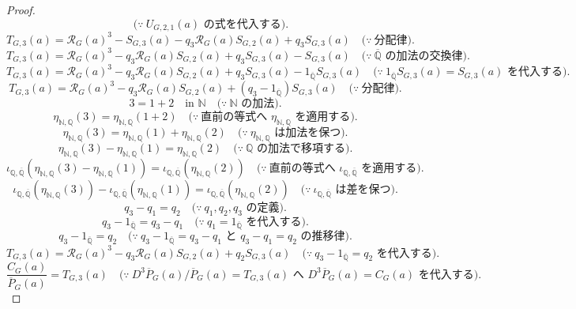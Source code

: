 \documentclass[11pt,a4paper]{article}
\theoremstyle{remark}
\begin{document}
\begin{proof}
\[\quad\bigl(\because\ U_{G,2,1}(a)\text{ の式を代入する}\bigr).\]
\[T_{G,3}(a)
=
\mathcal R_G(a)^3
-S_{G,3}(a)
-q_3\mathcal R_G(a)S_{G,2}(a)
+q_3S_{G,3}(a)
\quad\bigl(\because\ \text{分配律}\bigr).\]
\[T_{G,3}(a)
=
\mathcal R_G(a)^3
-q_3\mathcal R_G(a)S_{G,2}(a)
+q_3S_{G,3}(a)
-S_{G,3}(a)
\quad\bigl(\because\ \overline{\mathbb Q}\text{ の加法の交換律}\bigr).\]
\[T_{G,3}(a)
=
\mathcal R_G(a)^3
-q_3\mathcal R_G(a)S_{G,2}(a)
+q_3S_{G,3}(a)
-1_{\overline{\mathbb Q}}S_{G,3}(a)
\quad\bigl(\because\ 1_{\overline{\mathbb Q}}S_{G,3}(a)=S_{G,3}(a)\text{ を代入する}\bigr).\]
\[T_{G,3}(a)
=
\mathcal R_G(a)^3
-q_3\mathcal R_G(a)S_{G,2}(a)
+(q_3-1_{\overline{\mathbb Q}})S_{G,3}(a)
\quad\bigl(\because\ \text{分配律}\bigr).\]
\[3=1+2
\quad\text{in }\mathbb N
\quad\bigl(\because\ \mathbb N\text{ の加法}\bigr).\]
\[\eta_{\mathbb N,\mathbb Q}(3)
=\eta_{\mathbb N,\mathbb Q}(1+2)
\quad\bigl(\because\ \text{直前の等式へ }\eta_{\mathbb N,\mathbb Q}\text{ を適用する}\bigr).\]
\[\eta_{\mathbb N,\mathbb Q}(3)
=\eta_{\mathbb N,\mathbb Q}(1)+\eta_{\mathbb N,\mathbb Q}(2)
\quad\bigl(\because\ \eta_{\mathbb N,\mathbb Q}\text{ は加法を保つ}\bigr).\]
\[\eta_{\mathbb N,\mathbb Q}(3)-\eta_{\mathbb N,\mathbb Q}(1)
=\eta_{\mathbb N,\mathbb Q}(2)
\quad\bigl(\because\ \mathbb Q\text{ の加法で移項する}\bigr).\]
\[\iota_{\mathbb Q,\overline{\mathbb Q}}\!\left(
  \eta_{\mathbb N,\mathbb Q}(3)-\eta_{\mathbb N,\mathbb Q}(1)
\right)
=\iota_{\mathbb Q,\overline{\mathbb Q}}\!\left(
  \eta_{\mathbb N,\mathbb Q}(2)
\right)
\quad\bigl(\because\ \text{直前の等式へ }\iota_{\mathbb Q,\overline{\mathbb Q}}\text{ を適用する}\bigr).\]
\[\iota_{\mathbb Q,\overline{\mathbb Q}}\!\left(
  \eta_{\mathbb N,\mathbb Q}(3)
\right)
-\iota_{\mathbb Q,\overline{\mathbb Q}}\!\left(
  \eta_{\mathbb N,\mathbb Q}(1)
\right)
=\iota_{\mathbb Q,\overline{\mathbb Q}}\!\left(
  \eta_{\mathbb N,\mathbb Q}(2)
\right)
\quad\bigl(\because\ \iota_{\mathbb Q,\overline{\mathbb Q}}\text{ は差を保つ}\bigr).\]
\[q_3-q_1=q_2
\quad\bigl(\because\ q_1,q_2,q_3\text{ の定義}\bigr).\]
\[q_3-1_{\overline{\mathbb Q}}=q_3-q_1
\quad\bigl(\because\ q_1=1_{\overline{\mathbb Q}}\text{ を代入する}\bigr).\]
\[q_3-1_{\overline{\mathbb Q}}=q_2
\quad\bigl(\because\ q_3-1_{\overline{\mathbb Q}}=q_3-q_1
\text{ と }q_3-q_1=q_2\text{ の推移律}\bigr).\]
\[T_{G,3}(a)
=
\mathcal R_G(a)^3
-q_3\mathcal R_G(a)S_{G,2}(a)
+q_2S_{G,3}(a)
\quad\bigl(\because\ q_3-1_{\overline{\mathbb Q}}=q_2\text{ を代入する}\bigr).\]
\[\frac{C_G(a)}{\overline P_G(a)}
=T_{G,3}(a)
\quad\bigl(\because\ D^3\overline P_G(a)/\overline P_G(a)=T_{G,3}(a)\text{ へ }D^3\overline P_G(a)=C_G(a)\text{ を代入する}\bigr).\]

\end{proof}
\end{document}
